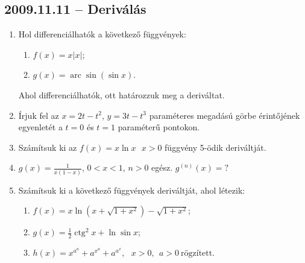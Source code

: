 \documentclass{article}
\newenvironment{abc}{\begin{enumerate}[label=\textit{\alph*})]}{\end{enumerate}}
\newcommand{\ctg}{\mathop{\mathrm{ctg}}\nolimits}
\newcommand{\arc}{\mathop{\mathrm{arc}}\nolimits}
\renewcommand{\arcsin}{\arc\sin}
\begin{document}
\subsection*{2009.11.11 -- Deriválás}
\begin{enumerate}
\item Hol differenciálhatók a következő függvények: 
	\begin{abc}
	\item $f(x)=x |x|$;
	\item $g(x)=\arcsin (\sin x)$.
	\end{abc}
	Ahol differenciálhatók, ott határozzuk meg a deriváltat.
\item Írjuk fel az $x=2t-t^2$, $y=3t-t^3$ paraméteres megadású görbe érintőjének egyenletét a $t=0$ és $t=1$ paraméterű pontokon.
\item Számítsuk ki az $f(x)=x \ln x~~~x>0$  függvény 5-ödik deriváltját.
\item $g(x)=\frac{1}{x(1-x)}$, $0<x<1$, $n>0$ egész. $g^{(n)}(x)=?$
\item Számítsuk ki a következő függvények deriváltját, ahol létezik: 
	\begin{abc}
	\item $f(x)=x \ln (x+ \sqrt{1+x^2})-\sqrt{1+x^2}$;
	\item $g(x)=\frac{1}{2}\ctg^2 x+\ln \sin x$;
	\item $h(x)=x^{a^a}+a^{x^a}+a^{a^x},~~~x>0,~~a>0~\text{rögzített.}$
	\end{abc}
\end{enumerate}
\end{document}
